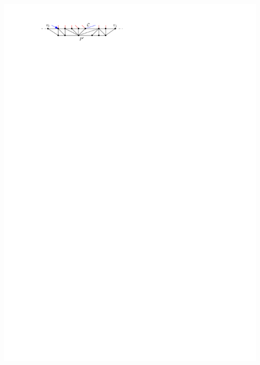 \documentclass[a4paper]{article}
\begin{document}
\includegraphics[width = \textwidth]{./unifiedAlgo/img/sweep/updateBefore.pdf}
\clearpage%
\end{document}
